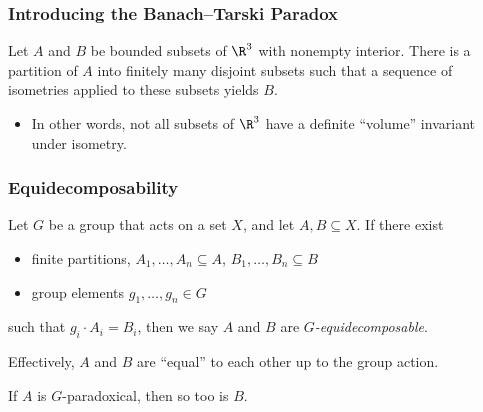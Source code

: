 \documentclass{beamer-custom}
\begin{document}
\begin{frame}
  \frametitle{Introducing the Banach--Tarski Paradox}
  \begin{theorem}
    Let $A$ and $B$ be bounded subsets of $\R^3$ with nonempty interior. There is a partition of $A$ into finitely many disjoint subsets such that a sequence of isometries applied to these subsets yields $B$.
  \end{theorem}\pause
  \begin{itemize}
    \item In other words, not all subsets of $\R^3$ have a definite ``volume'' invariant under isometry.
  \end{itemize}
\end{frame}
\begin{frame}
  \frametitle{Equidecomposability}
  Let $G$ be a group that acts on a set $X$, and let $A,B\subseteq X$. If there exist
  \begin{itemize}
    \item finite partitions, $A_1,\dots,A_n\subseteq A$, $B_1,\dots,B_n\subseteq B$
    \item group elements $g_1,\dots,g_n\in G$
  \end{itemize}
  such that $g_i\cdot A_i = B_i$, then we say $A$ and $B$ are \textit{$G$-equidecomposable}.\pause\newline

  Effectively, $A$ and $B$ are ``equal'' to each other up to the group action.\pause\newline

  If $A$ is $G$-paradoxical, then so too is $B$.
\end{frame}
\end{document}
